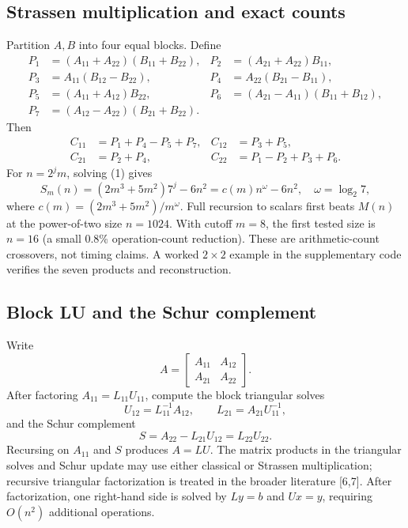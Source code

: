 \documentclass[9pt,a4paper]{article}
\begin{document}
\subsection{Strassen multiplication and exact counts}
Partition $A,B$ into four equal blocks. Define
\begin{align*}
P_1&=(A_{11}+A_{22})(B_{11}+B_{22}),&P_2&=(A_{21}+A_{22})B_{11},\\
P_3&=A_{11}(B_{12}-B_{22}),&P_4&=A_{22}(B_{21}-B_{11}),\\
P_5&=(A_{11}+A_{12})B_{22},&P_6&=(A_{21}-A_{11})(B_{11}+B_{12}),\\
P_7&=(A_{12}-A_{22})(B_{21}+B_{22}).
\end{align*}
Then
\begin{align*}
C_{11}&=P_1+P_4-P_5+P_7,& C_{12}&=P_3+P_5,\\
C_{21}&=P_2+P_4,& C_{22}&=P_1-P_2+P_3+P_6.
\end{align*}
For $n=2^jm$, solving (1) gives
\begin{equation}
S_m(n)=(2m^3+5m^2)7^j-6n^2=c(m)n^\omega-6n^2,
\quad \omega=\log_2 7,
\tag{2}
\end{equation}
where $c(m)=(2m^3+5m^2)/m^\omega$. Full recursion to scalars first beats $M(n)$ at the power-of-two size $n=1024$. With cutoff $m=8$, the first tested size is $n=16$ (a small 0.8\% operation-count reduction). These are arithmetic-count crossovers, not timing claims. A worked $2\times2$ example in the supplementary code verifies the seven products and reconstruction.

\subsection{Block LU and the Schur complement}
Write
\[
A=\begin{bmatrix}A_{11}&A_{12}\\A_{21}&A_{22}\end{bmatrix}.
\]
After factoring $A_{11}=L_{11}U_{11}$, compute the block triangular solves
\[
U_{12}=L_{11}^{-1}A_{12},\qquad L_{21}=A_{21}U_{11}^{-1},
\]
and the Schur complement
\[
S=A_{22}-L_{21}U_{12}=L_{22}U_{22}.
\]
Recursing on $A_{11}$ and $S$ produces $A=LU$. The matrix products in the triangular solves and Schur update may use either classical or Strassen multiplication; recursive triangular factorization is treated in the broader literature [6,7]. After factorization, one right-hand side is solved by $Ly=b$ and $Ux=y$, requiring $O(n^2)$ additional operations.
\end{document}
